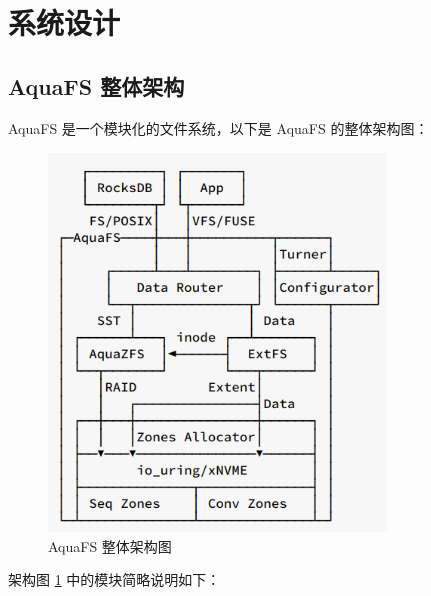 \section{系统设计}

\subsection{AquaFS 整体架构}

AquaFS 是一个模块化的文件系统，以下是 AquaFS 的整体架构图：

\begin{figure}[H]
    \centering
    \includegraphics[width=0.8\textwidth]{fig/aquafs-frame}
    \caption{AquaFS 整体架构图}
    \label{aquafs-frame}
\end{figure}

架构图 \ref{aquafs-frame} 中的模块简略说明如下：

